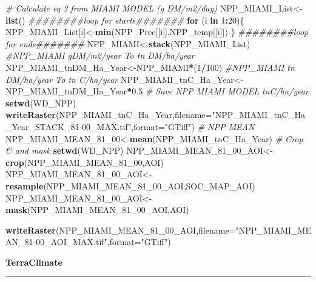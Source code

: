 \documentclass[
  10pt,
  b5paper,
]{book}
\newenvironment{Shaded}{\begin{snugshade}}{\end{snugshade}}
\newcommand{\CommentTok}[1]{\textcolor[rgb]{0.56,0.35,0.01}{\textit{#1}}}
\newcommand{\ControlFlowTok}[1]{\textcolor[rgb]{0.13,0.29,0.53}{\textbf{#1}}}
\newcommand{\DataTypeTok}[1]{\textcolor[rgb]{0.13,0.29,0.53}{#1}}
\newcommand{\DecValTok}[1]{\textcolor[rgb]{0.00,0.00,0.81}{#1}}
\newcommand{\FloatTok}[1]{\textcolor[rgb]{0.00,0.00,0.81}{#1}}
\newcommand{\KeywordTok}[1]{\textcolor[rgb]{0.13,0.29,0.53}{\textbf{#1}}}
\newcommand{\NormalTok}[1]{#1}
\newcommand{\OperatorTok}[1]{\textcolor[rgb]{0.81,0.36,0.00}{\textbf{#1}}}
\newcommand{\StringTok}[1]{\textcolor[rgb]{0.31,0.60,0.02}{#1}}
\begin{document}
\begin{Shaded}
\begin{Highlighting}[]
\CommentTok{# Calculate eq 3 from MIAMI MODEL (g DM/m2/day)}
\NormalTok{NPP_MIAMI_List<-}\KeywordTok{list}\NormalTok{()}
\CommentTok{########loop for starts#######}
\ControlFlowTok{for}\NormalTok{ (i }\ControlFlowTok{in} \DecValTok{1}\OperatorTok{:}\DecValTok{20}\NormalTok{)\{}
\NormalTok{NPP_MIAMI_List[i]<-}\KeywordTok{min}\NormalTok{(NPP_Prec[[i]],NPP_temp[[i]])}
\NormalTok{\}}
\CommentTok{########loop for ends#######}
\NormalTok{NPP_MIAMI<-}\KeywordTok{stack}\NormalTok{(NPP_MIAMI_List)}
\CommentTok{#NPP_MIAMI gDM/m2/year To tn DM/ha/year}
\NormalTok{NPP_MIAMI_tnDM_Ha_Year<-NPP_MIAMI}\OperatorTok{*}\NormalTok{(}\DecValTok{1}\OperatorTok{/}\DecValTok{100}\NormalTok{)}
\CommentTok{#NPP_MIAMI tn DM/ha/year To tn C/ha/year}
\NormalTok{NPP_MIAMI_tnC_Ha_Year<-NPP_MIAMI_tnDM_Ha_Year}\OperatorTok{*}\FloatTok{0.5}
\CommentTok{# Save NPP MIAMI MODEL tnC/ha/year}
\KeywordTok{setwd}\NormalTok{(WD_NPP)}
\KeywordTok{writeRaster}\NormalTok{(NPP_MIAMI_tnC_Ha_Year,}\DataTypeTok{filename=}\StringTok{"NPP_MIAMI_tnC_Ha_Year_STACK_81-00_MAX.tif"}\NormalTok{,}\DataTypeTok{format=}\StringTok{"GTiff"}\NormalTok{)}
\CommentTok{# NPP MEAN}
\NormalTok{NPP_MIAMI_MEAN_}\DecValTok{81}\NormalTok{_}\DecValTok{00}\NormalTok{<-}\KeywordTok{mean}\NormalTok{(NPP_MIAMI_tnC_Ha_Year)}
\CommentTok{# Crop & and mask}
\KeywordTok{setwd}\NormalTok{(WD_NPP)}
\NormalTok{NPP_MIAMI_MEAN_}\DecValTok{81}\NormalTok{_}\DecValTok{00}\NormalTok{_AOI<-}\KeywordTok{crop}\NormalTok{(NPP_MIAMI_MEAN_}\DecValTok{81}\NormalTok{_}\DecValTok{00}\NormalTok{,AOI)}
\NormalTok{NPP_MIAMI_MEAN_}\DecValTok{81}\NormalTok{_}\DecValTok{00}\NormalTok{_AOI<-}\KeywordTok{resample}\NormalTok{(NPP_MIAMI_MEAN_}\DecValTok{81}\NormalTok{_}\DecValTok{00}\NormalTok{_AOI,SOC_MAP_AOI)}
\NormalTok{NPP_MIAMI_MEAN_}\DecValTok{81}\NormalTok{_}\DecValTok{00}\NormalTok{_AOI<-}\KeywordTok{mask}\NormalTok{(NPP_MIAMI_MEAN_}\DecValTok{81}\NormalTok{_}\DecValTok{00}\NormalTok{_AOI,AOI)}

\KeywordTok{writeRaster}\NormalTok{(NPP_MIAMI_MEAN_}\DecValTok{81}\NormalTok{_}\DecValTok{00}\NormalTok{_AOI,}\DataTypeTok{filename=}\StringTok{"NPP_MIAMI_MEAN_81-00_AOI_MAX.tif"}\NormalTok{,}\DataTypeTok{format=}\StringTok{"GTiff"}\NormalTok{)}
\end{Highlighting}
\end{Shaded}

\textbf{TerraClimate}

\begin{center}\rule{0.5\linewidth}{0.5pt}\end{center}
\end{document}
